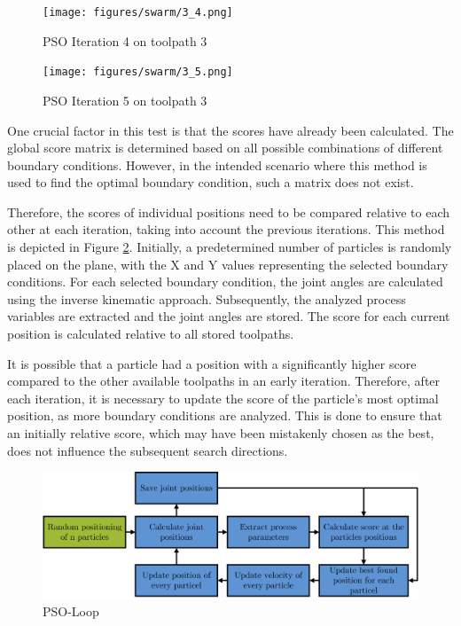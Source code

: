 \begin{figure}[H]	
		\centering
	\begin{minipage}{0.5\textwidth}
		\texttt{[image: figures/swarm/3\_4.png]}
		\caption{PSO Iteration 4 on toolpath 3}
		\label{4}
	\end{minipage}\hfill
	\begin{minipage}{0.5\textwidth}
		\texttt{[image: figures/swarm/3\_5.png]}
		\caption{PSO Iteration 5 on toolpath 3}
		\label{5}
	\end{minipage}\par
\end{figure}

One crucial factor in this test is that the scores have already been calculated. The global score matrix is determined based on all possible combinations of different boundary conditions. However, in the intended scenario where this method is used to find the optimal boundary condition, such a matrix does not exist.
\newpage

Therefore, the scores of individual positions need to be compared relative to each other at each iteration, taking into account the previous iterations. This method is depicted in Figure \ref{swarmloop}. Initially, a predetermined number of particles is randomly placed on the plane, with the X and Y values representing the selected boundary conditions. For each selected boundary condition, the joint angles are calculated using the inverse kinematic approach. Subsequently, the analyzed process variables are extracted and the joint angles are stored. The score for each current position is calculated relative to all stored toolpaths.

It is possible that a particle had a position with a significantly higher score compared to the other available toolpaths in an early iteration. Therefore, after each iteration, it is necessary to update the score of the particle's most optimal position, as more boundary conditions are analyzed. This is done to ensure that an initially relative score, which may have been mistakenly chosen as the best, does not influence the subsequent search directions.

\begin{figure}[H]
	\centerline{\includegraphics[width=1\textwidth]{figures/swarmloop.png}}
	\caption{PSO-Loop}
	\label{swarmloop}
\end{figure}

